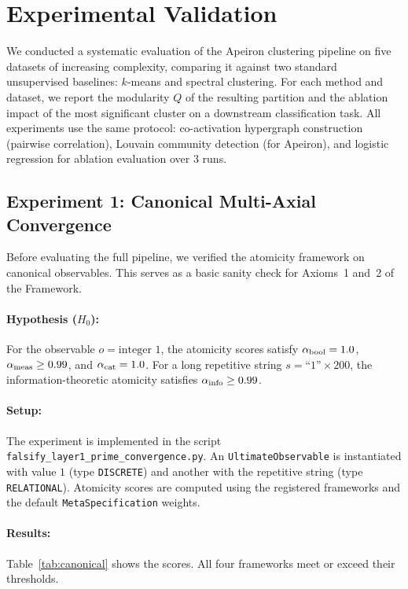 \clearpage
\section{Experimental Validation}
\label{sec:experiments}

We conducted a systematic evaluation of the Apeiron clustering pipeline on five datasets of increasing complexity, comparing it against two standard unsupervised baselines: $k$-means and spectral clustering. For each method and dataset, we report the modularity $Q$ of the resulting partition and the ablation impact of the most significant cluster on a downstream classification task. All experiments use the same protocol: co-activation hypergraph construction (pairwise correlation), Louvain community detection (for Apeiron), and logistic regression for ablation evaluation over 3 runs.

\subsection{Experiment 1: Canonical Multi-Axial Convergence}

Before evaluating the full pipeline, we verified the atomicity framework on canonical observables. This serves as a basic sanity check for Axioms~1 and~2 of the \Apeiron{} Framework.

\paragraph{Hypothesis ($H_0$):} For the observable $o = \text{integer } 1$, the atomicity scores satisfy $\alpha_{\text{bool}} = 1.0$, $\alpha_{\text{meas}} \ge 0.99$, and $\alpha_{\text{cat}} = 1.0$. For a long repetitive string $s = \text{``1''} \times 200$, the information-theoretic atomicity satisfies $\alpha_{\text{info}} \ge 0.99$.

\paragraph{Setup:} The experiment is implemented in the script \texttt{falsify\_layer1\_prime\_convergence.py}. An \texttt{UltimateObservable} is instantiated with value $1$ (type \texttt{DISCRETE}) and another with the repetitive string (type \texttt{RELATIONAL}). Atomicity scores are computed using the registered frameworks and the default \texttt{MetaSpecification} weights.

\paragraph{Results:} Table~\ref{tab:canonical} shows the scores. All four frameworks meet or exceed their thresholds.

